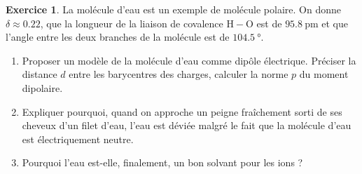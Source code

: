 \documentclass{article}
\theoremstyle{definition}
\newtheorem{exo}{Exercice}
\theoremstyle{remark}
\begin{document}
\begin{exo}
	La molécule d'eau est un exemple de molécule polaire. On donne $\delta\approx\num{0.22}$, que la longueur de la liaison de covalence $\mathrm{H}-\mathrm{O}$ est de $\SI{95.8}{\pico\meter}$ et que l'angle entre les deux branches de la molécule est de $\SI{104.5}{°}$.
	\begin{enumerate}
		\item Proposer un modèle de la molécule d'eau comme dipôle électrique. Préciser la distance $d$ entre les barycentres des charges, calculer la norme $p$ du moment dipolaire.
		\item Expliquer pourquoi, quand on approche un peigne fraîchement sorti de ses cheveux d'un filet d'eau, l'eau est déviée malgré le fait que la molécule d'eau est électriquement neutre.
		\item Pourquoi l'eau est-elle, finalement, un bon solvant pour les ions ?
	\end{enumerate}
\end{exo}
\end{document}
